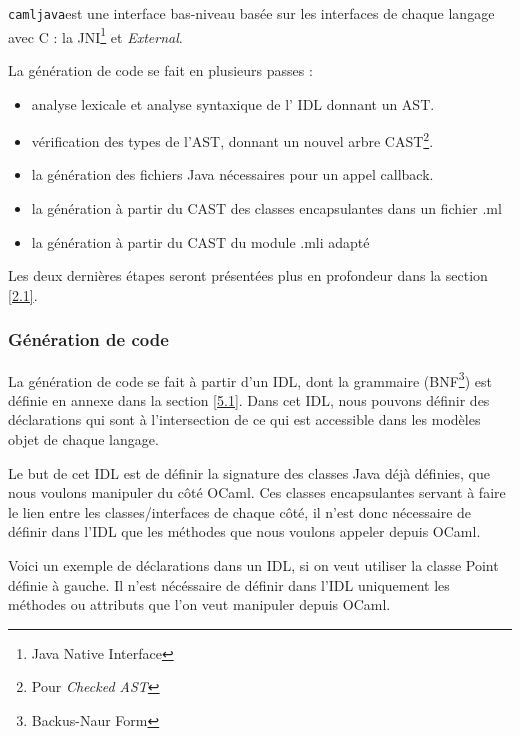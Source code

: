 \documentclass[a4paper, 11pt]{article}
\newcommand{\camljava}{{\tt{camljava}}}
\begin{document}
\camljava est une interface bas-niveau basée sur les interfaces de chaque langage avec C : la JNI\footnote{Java Native Interface} et \emph{External}.

La génération de code se fait en plusieurs passes :
\begin{itemize}
\item analyse lexicale et analyse syntaxique de l' IDL donnant un AST.
\item vérification des types de l'AST, donnant un nouvel arbre CAST\footnote{Pour \emph{Checked AST}}.
\item la génération des fichiers Java nécessaires pour un appel callback. 
\item la génération à partir du CAST des classes encapsulantes dans un fichier .ml
\item la génération à partir du CAST du module .mli adapté
\end{itemize}
Les deux dernières étapes seront présentées plus en profondeur dans la
section \ref{2.1}.




\subsubsection{Génération de code}
La génération de code se fait à partir d'un IDL, dont la grammaire
(BNF\footnote{Backus-Naur Form}) est définie en annexe dans la section \ref{5.1}.
Dans cet IDL, nous pouvons définir des déclarations qui sont à
l'intersection de ce qui est accessible dans les modèles objet de
chaque langage. 

Le but de cet IDL est de définir la signature des
classes Java déjà définies, que nous voulons manipuler du côté OCaml.
Ces classes encapsulantes servant à faire le lien entre les
classes/interfaces de chaque côté, il n'est donc nécessaire de définir
dans l'IDL que les méthodes que nous voulons appeler depuis OCaml.

Voici un exemple de déclarations dans un IDL, si on veut utiliser la classe Point définie à gauche. Il n'est nécéssaire de définir dans l'IDL uniquement les méthodes ou attributs que l'on veut manipuler depuis OCaml.

\newpage
\end{document}
